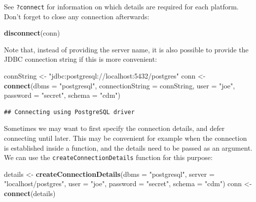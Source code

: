 \documentclass[11pt]{book}
\newenvironment{Shaded}{\begin{snugshade}}{\end{snugshade}}
\newcommand{\DataTypeTok}[1]{\textcolor[rgb]{0.13,0.29,0.53}{#1}}
\newcommand{\KeywordTok}[1]{\textcolor[rgb]{0.13,0.29,0.53}{\textbf{#1}}}
\newcommand{\NormalTok}[1]{#1}
\newcommand{\StringTok}[1]{\textcolor[rgb]{0.31,0.60,0.02}{#1}}
\theoremstyle{definition}
\theoremstyle{definition}
\theoremstyle{definition}
\theoremstyle{remark}
\begin{document}
See \texttt{?connect} for information on which details are required for each platform. Don't forget to close any connection afterwards:

\begin{Shaded}
\begin{Highlighting}[]
\KeywordTok{disconnect}\NormalTok{(conn)}
\end{Highlighting}
\end{Shaded}

Note that, instead of providing the server name, it is also possible to provide the JDBC connection string if this is more convenient:

\begin{Shaded}
\begin{Highlighting}[]
\NormalTok{connString <-}\StringTok{ "jdbc:postgresql://localhost:5432/postgres"}
\NormalTok{conn <-}\StringTok{ }\KeywordTok{connect}\NormalTok{(}\DataTypeTok{dbms =} \StringTok{"postgresql"}\NormalTok{,}
                \DataTypeTok{connectionString =}\NormalTok{ connString,}
                \DataTypeTok{user =} \StringTok{"joe"}\NormalTok{,}
                \DataTypeTok{password =} \StringTok{"secret"}\NormalTok{,}
                \DataTypeTok{schema =} \StringTok{"cdm"}\NormalTok{)}
\end{Highlighting}
\end{Shaded}

\begin{verbatim}
## Connecting using PostgreSQL driver
\end{verbatim}

Sometimes we may want to first specify the connection details, and defer connecting until later. This may be convenient for example when the connection is established inside a function, and the details need to be passed as an argument. We can use the \texttt{createConnectionDetails} function for this purpose:

\begin{Shaded}
\begin{Highlighting}[]
\NormalTok{details <-}\StringTok{ }\KeywordTok{createConnectionDetails}\NormalTok{(}\DataTypeTok{dbms =} \StringTok{"postgresql"}\NormalTok{,}
                                   \DataTypeTok{server =} \StringTok{"localhost/postgres"}\NormalTok{,}
                                   \DataTypeTok{user =} \StringTok{"joe"}\NormalTok{,}
                                   \DataTypeTok{password =} \StringTok{"secret"}\NormalTok{,}
                                   \DataTypeTok{schema =} \StringTok{"cdm"}\NormalTok{)}
\NormalTok{conn <-}\StringTok{ }\KeywordTok{connect}\NormalTok{(details)}
\end{Highlighting}
\end{Shaded}
\end{document}
